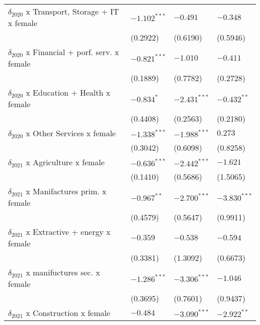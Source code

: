 \begin{tabular}{llll}
$\delta_{2020}$ x Transport, Storage + IT x female &     $-1.102^{***}$ &           $-0.491$ &           $-0.348$ \\
                                                   &           (0.2922) &           (0.6190) &           (0.5946) \\
$\delta_{2020}$ x Financial + porf. serv. x female &     $-0.821^{***}$ &           $-1.010$ &           $-0.411$ \\
                                                   &           (0.1889) &           (0.7782) &           (0.2728) \\
$\delta_{2020}$ x Education + Health x female      &         $-0.834^*$ &     $-2.431^{***}$ &      $-0.432^{**}$ \\
                                                   &           (0.4408) &           (0.2563) &           (0.2180) \\
$\delta_{2020}$ x Other Services x female          &     $-1.338^{***}$ &     $-1.988^{***}$ &            $0.273$ \\
                                                   &           (0.3042) &           (0.6098) &           (0.8258) \\
$\delta_{2021}$ x Agriculture x female             &     $-0.636^{***}$ &     $-2.442^{***}$ &           $-1.621$ \\
                                                   &           (0.1410) &           (0.5686) &           (1.5065) \\
$\delta_{2021}$ x Manifactures prim. x female      &      $-0.967^{**}$ &     $-2.700^{***}$ &     $-3.830^{***}$ \\
                                                   &           (0.4579) &           (0.5647) &           (0.9911) \\
$\delta_{2021}$ x Extractive + energy x female     &           $-0.359$ &           $-0.538$ &           $-0.594$ \\
                                                   &           (0.3381) &           (1.3092) &           (0.6673) \\
$\delta_{2021}$ x manifuctures sec. x female       &     $-1.286^{***}$ &     $-3.306^{***}$ &           $-1.046$ \\
                                                   &           (0.3695) &           (0.7601) &           (0.9437) \\
$\delta_{2021}$ x Construction x female            &           $-0.484$ &     $-3.090^{***}$ &      $-2.922^{**}$ \\

\end{tabular}
